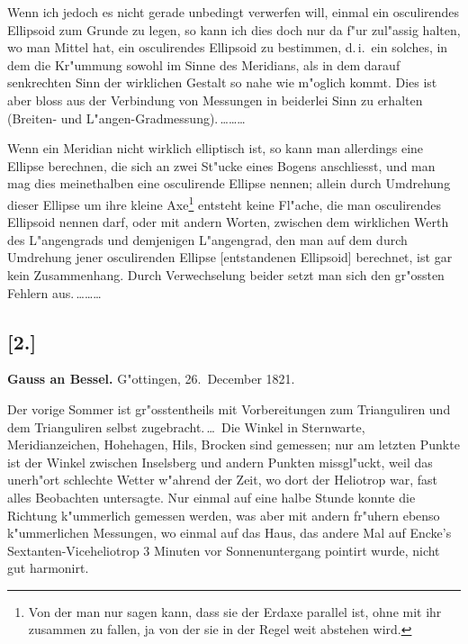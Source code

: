 \documentclass[12pt,a4paper]{article}
\theoremstyle{plain}
\theoremstyle{definition}
\theoremstyle{remark}
\begin{document}
Wenn ich jedoch es nicht gerade unbedingt verwerfen will, einmal ein osculirendes Ellipsoid zum Grunde zu legen, so kann ich dies doch nur da f"ur zul"assig halten, wo man Mittel hat, ein osculirendes Ellipsoid zu bestimmen, d.\,i.\ ein solches, in dem die Kr"ummung sowohl im Sinne des Meridians, als in dem darauf senkrechten Sinn der wirklichen Gestalt so nahe wie m"oglich kommt. Dies ist aber bloss aus der Verbindung von Messungen in beiderlei Sinn zu erhalten (Breiten- und L"angen-Gradmessung).\,\ldots\ldots\ldots

\newpage
\noindent Wenn ein Meridian nicht wirklich elliptisch ist, so kann man allerdings eine Ellipse berechnen, die sich an zwei St"ucke eines Bogens anschliesst, und man mag dies meinethalben eine osculirende Ellipse nennen; allein durch Umdrehung dieser Ellipse um ihre kleine Axe\footnote{Von der man nur sagen kann, dass sie der Erdaxe parallel ist, ohne mit ihr zusammen zu fallen, ja von der sie in der Regel weit abstehen wird.} entsteht keine Fl"ache, die man osculirendes Ellipsoid nennen darf, oder mit andern Worten, zwischen dem wirklichen Werth des L"angengrads und demjenigen L"angengrad, den man auf dem durch Umdrehung jener osculirenden Ellipse [entstandenen Ellipsoid] berechnet, ist gar kein Zusammenhang. Durch Verwechselung beider setzt man sich den gr"ossten Fehlern aus.\,\ldots\ldots\ldots

\newpage
\subsection*{[2.]}

\noindent \textbf{Gauss an Bessel.} G"ottingen, 26.~December 1821.

\medskip
\noindent Der vorige Sommer ist gr"osstentheils mit Vorbereitungen zum Trianguliren und dem Trianguliren selbst zugebracht.\,\ldots\ Die Winkel in Sternwarte, Meridianzeichen, Hohehagen, Hils, Brocken sind gemessen; nur am letzten Punkte ist der Winkel zwischen Inselsberg und andern Punkten missgl"uckt, weil das unerh"ort schlechte Wetter w"ahrend der Zeit, wo dort der Heliotrop war, fast alles Beobachten untersagte. Nur einmal auf eine halbe Stunde konnte die Richtung k"ummerlich gemessen werden, was aber mit andern fr"uhern ebenso k"ummerlichen Messungen, wo einmal auf das Haus, das andere Mal auf Encke's Sextanten-Viceheliotrop 3 Minuten vor Sonnenuntergang pointirt wurde, nicht gut harmonirt.
\end{document}
